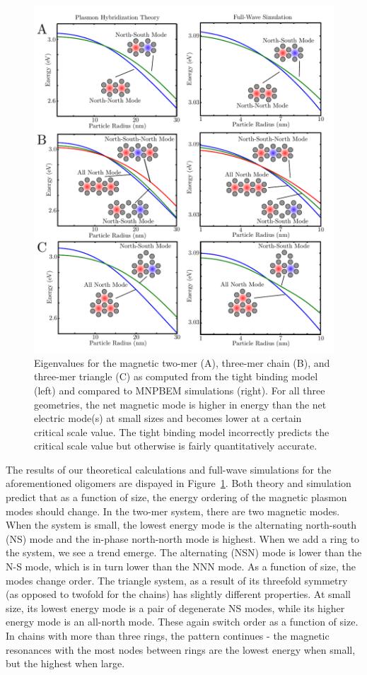 \documentclass[journal=apchd5,manuscript=article]{achemso}
\begin{document}
\begin{figure}
\begin{center}
\includegraphics{theory_bem_comparison_fig1.pdf}
\caption{Eigenvalues for the magnetic two-mer (A), three-mer chain (B), and three-mer triangle (C) as computed from the tight binding model (left) and compared to MNPBEM simulations (right). For all three geometries, the net magnetic mode is higher in energy than the net electric mode(s) at small sizes and becomes lower at a certain critical scale value. The tight binding model incorrectly predicts the critical scale value but otherwise is fairly quantitatively accurate.}
\label{theory_simul}
\end{center}
\end{figure}

The results of our theoretical calculations and full-wave simulations for the aforementioned oligomers are dispayed in Figure~\ref{theory_simul}. Both theory and simulation predict that as a function of size, the energy ordering of the magnetic plasmon modes should change. In the two-mer system, there are two magnetic modes. When the system is small, the lowest energy mode is the alternating north-south (NS) mode and the in-phase north-north mode is highest. When we add a ring to the system, we see a trend emerge. The alternating (NSN) mode is lower than the N-S mode, which is in turn lower than the NNN mode. As a function of size, the modes change order. The triangle system, as a result of its threefold symmetry (as opposed to twofold for the chains) has slightly different properties. At small size, its lowest energy mode is a pair of degenerate NS modes, while its higher energy mode is an all-north mode. These again switch order as a function of size. In chains with more than three rings, the pattern continues - the magnetic resonances with the most nodes between rings are the lowest energy when small, but the highest when large.
\end{document}
